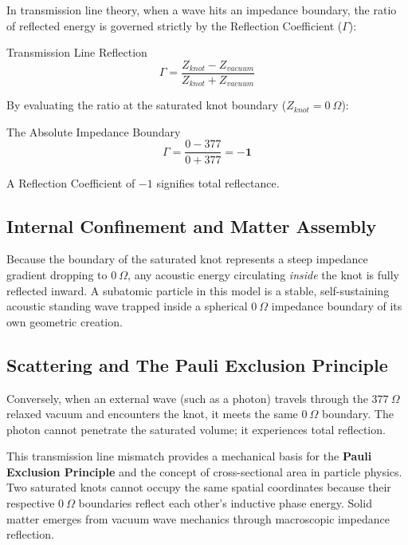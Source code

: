 In transmission line theory, when a wave hits an impedance boundary, the ratio of reflected energy is governed strictly by the Reflection Coefficient ($\Gamma$):
\begin{resultbox}{Transmission Line Reflection}
\begin{equation}
    \Gamma = \frac{Z_{knot} - Z_{vacuum}}{Z_{knot} + Z_{vacuum}}
\end{equation}
\end{resultbox}

By evaluating the ratio at the saturated knot boundary ($Z_{knot} = 0 \ \Omega$):
\begin{resultbox}{The Absolute Impedance Boundary}
\begin{equation}
    \Gamma = \frac{0 - 377}{0 + 377} = \mathbf{-1}
\end{equation}
\end{resultbox}
A Reflection Coefficient of $-1$ signifies total reflectance.

\subsection{Internal Confinement and Matter Assembly}
Because the boundary of the saturated knot represents a steep impedance gradient dropping to $0 \ \Omega$, any acoustic energy circulating \textit{inside} the knot is fully reflected inward. 
A subatomic particle in this model is a stable, self-sustaining acoustic standing wave trapped inside a spherical $0 \ \Omega$ impedance boundary of its own geometric creation.

\subsection{Scattering and The Pauli Exclusion Principle}
Conversely, when an external wave (such as a photon) travels through the $377 \ \Omega$ relaxed vacuum and encounters the knot, it meets the same $0 \ \Omega$ boundary. The photon cannot penetrate the saturated volume; it experiences total reflection. 

This transmission line mismatch provides a mechanical basis for the \textbf{Pauli Exclusion Principle} and the concept of cross-sectional area in particle physics. Two saturated knots cannot occupy the same spatial coordinates because their respective $0 \ \Omega$ boundaries reflect each other's inductive phase energy. Solid matter emerges from vacuum wave mechanics through macroscopic impedance reflection.

